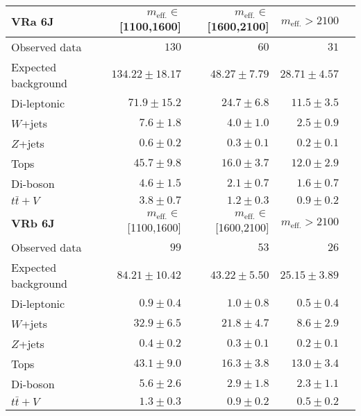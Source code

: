 \begin{table}
  \begin{center}
    \caption{ \label{tab::BGestimation::VRyields_6J}   }

    \begin{tabular*}{\textwidth}{@{\extracolsep{\fill}}lrrrr}
      \toprule
      \textbf{VRa 6J} & $m_{\mathrm{eff.}}\in$[1100,1600] & $m_{\mathrm{eff.}}\in$[1600,2100] & $m_{\mathrm{eff.}}>2100$ \\
      \midrule
      
Observed data          & $130$              & $60$              & $31$                    \\
\midrule
Expected background         & $134.22 \pm 18.17$          & $48.27 \pm 7.79$          & $28.71 \pm 4.57$              \\
\midrule
        Di-leptonic         & $71.9 \pm 15.2$          & $24.7 \pm 6.8$          & $11.5 \pm 3.5$              \\
        $W$+jets         & $7.6 \pm 1.8$          & $4.0 \pm 1.0$          & $2.5 \pm 0.9$              \\
        $Z$+jets         & $0.6 \pm 0.2$          & $0.3 \pm 0.1$          & $0.2 \pm 0.1$              \\
        Tops         & $45.7 \pm 9.8$          & $16.0 \pm 3.7$          & $12.0 \pm 2.9$              \\
        Di-boson         & $4.6 \pm 1.5$          & $2.1 \pm 0.7$          & $1.6 \pm 0.7$              \\
        $t\bar{t}+V$         & $3.8 \pm 0.7$          & $1.2 \pm 0.3$          & $0.9 \pm 0.2$              \\
\toprule
\textbf{VRb 6J} &  $m_{\mathrm{eff.}}\in$[1100,1600] & $m_{\mathrm{eff.}}\in$[1600,2100] & $m_{\mathrm{eff.}}>2100$ \\
\midrule
Observed data          & $99$              & $53$              & $26$                    \\
\midrule
Expected background         & $84.21 \pm 10.42$          & $43.22 \pm 5.50$          & $25.15 \pm 3.89$              \\
\midrule
        Di-leptonic         & $0.9 \pm 0.4$          & $1.0 \pm 0.8$          & $0.5 \pm 0.4$              \\
        $W$+jets         & $32.9 \pm 6.5$          & $21.8 \pm 4.7$          & $8.6 \pm 2.9$              \\
        $Z$+jets         & $0.4 \pm 0.2$          & $0.3 \pm 0.1$          & $0.2 \pm 0.1$              \\
        Tops         & $43.1 \pm 9.0$          & $16.3 \pm 3.8$          & $13.0 \pm 3.4$              \\
        Di-boson         & $5.6 \pm 2.6$          & $2.9 \pm 1.8$          & $2.3 \pm 1.1$              \\
        $t\bar{t}+V$         & $1.3 \pm 0.3$          & $0.9 \pm 0.2$          & $0.5 \pm 0.2$              \\
        \bottomrule
        \end{tabular*}

  \end{center}
\end{table}
